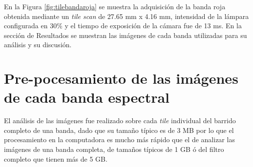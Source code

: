 En la Figura \ref{fig:tilebandaroja} se muestra la adquisición de la banda roja obtenida mediante un \textit{tile scan} de 27.65 mm x 4.16 mm, intensidad de la lámpara configurada en 30\% y el tiempo de exposición de la cámara fue de 13 ms. En la sección de Resultados se muestran las imágenes de cada banda utilizadas para su análisis y su discusión.



\singlespacing
\section*{Pre-pocesamiento de las imágenes de cada banda espectral }

\vspace{1.0cm}
\vspace{1.0cm}
\vspace{1.0cm}

\hspace{0.5cm}El análisis de las imágenes fue realizado sobre cada \textit{tile} individual del barrido completo de una banda, dado que su tamaño típico es de 3 MB por lo que el procesamiento en la computadora es mucho más rápido que el de analizar las imágenes de una banda completa, de tamaños típicos de 1 GB ó del filtro completo que tienen más de 5 GB.

